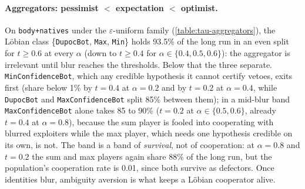 \paragraph{Aggregators: pessimist $<$ expectation $<$ optimist.}
On \texttt{body+natives} under the $\varepsilon$-uniform family (\cref{table:tau-aggregators}), the Löbian class \{\texttt{DupocBot}, \texttt{Max}, \texttt{Min}\} holds 93.5\% of the long run in an even split for $t \ge 0.6$ at every $\alpha$ (down to $t \ge 0.4$ for $\alpha \in \{0.4, 0.5, 0.6\}$): the aggregator is irrelevant until blur reaches the thresholds. Below that the three separate. \texttt{MinConfidenceBot}, which any credible hypothesis it cannot certify vetoes, exits first (share below 1\% by $t = 0.4$ at $\alpha = 0.2$ and by $t = 0.2$ at $\alpha = 0.4$, while \texttt{DupocBot} and \texttt{MaxConfidenceBot} split 85\% between them); in a mid-blur band \texttt{MaxConfidenceBot} alone takes 85 to 90\% ($t = 0.2$ at $\alpha \in \{0.5, 0.6\}$, already $t = 0.4$ at $\alpha = 0.8$), because the sum player is fooled into cooperating with blurred exploiters while the max player, which needs one hypothesis credible on its own, is not.
The band is a band of \emph{survival}, not of cooperation: at $\alpha = 0.8$ and $t = 0.2$ the sum and max players again share 88\% of the long run, but the population's cooperation rate is 0.01, since both survive as defectors.
Once identities blur, ambiguity aversion is what keeps a Löbian cooperator alive.



